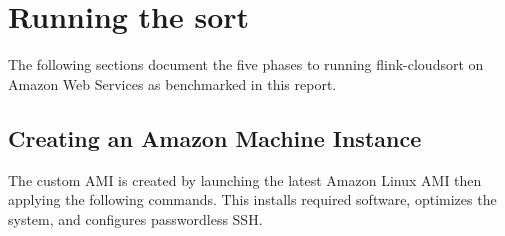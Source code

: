 \documentclass{article}
\begin{document}
\section{Running the sort}

The following sections document the five phases to running flink-cloudsort on Amazon Web Services as benchmarked in this report.

\subsection{Creating an Amazon Machine Instance}

The custom AMI is created by launching the latest Amazon Linux AMI then applying the following commands. This installs required software, optimizes the system, and configures passwordless SSH.
\end{document}
